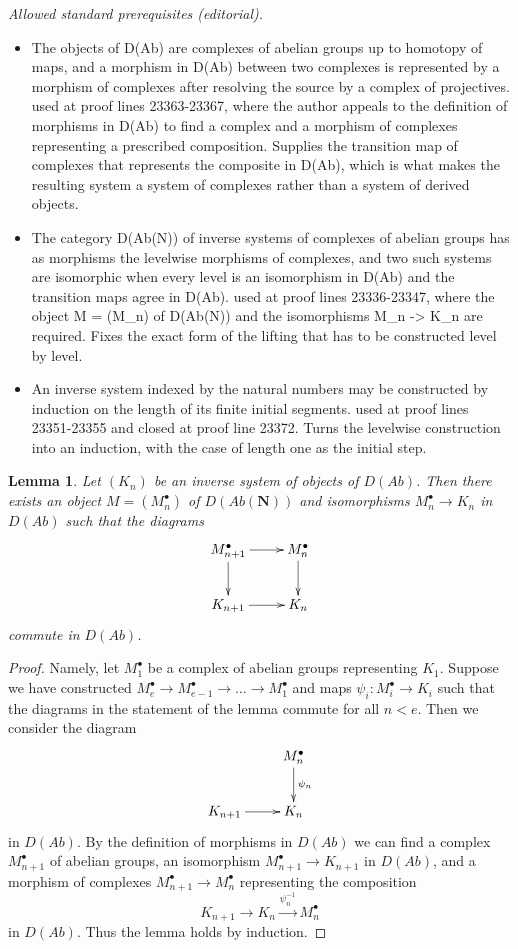 \documentclass[10pt,a4paper]{amsart}
\theoremstyle{plain}
\newtheorem{lemma}[subsection]{Lemma}
\theoremstyle{definition}
\theoremstyle{remark}
\numberwithin{equation}{subsection}
\begin{document}
\noindent\textit{Allowed standard prerequisites (editorial).}\begin{itemize}
\item The objects of D(Ab) are complexes of abelian groups up to homotopy of maps, and a morphism in D(Ab) between two complexes is represented by a morphism of complexes after resolving the source by a complex of projectives. used at proof lines 23363-23367, where the author appeals to the definition of morphisms in D(Ab) to find a complex and a morphism of complexes representing a prescribed composition. Supplies the transition map of complexes that represents the composite in D(Ab), which is what makes the resulting system a system of complexes rather than a system of derived objects.
\item The category D(Ab(N)) of inverse systems of complexes of abelian groups has as morphisms the levelwise morphisms of complexes, and two such systems are isomorphic when every level is an isomorphism in D(Ab) and the transition maps agree in D(Ab). used at proof lines 23336-23347, where the object M = (M\_n) of D(Ab(N)) and the isomorphisms M\_n -> K\_n are required. Fixes the exact form of the lifting that has to be constructed level by level.
\item An inverse system indexed by the natural numbers may be constructed by induction on the length of its finite initial segments. used at proof lines 23351-23355 and closed at proof line 23372. Turns the levelwise construction into an induction, with the case of length one as the initial step.
\end{itemize}\medskip
\begin{lemma}
\label{lemma-lift-to-system-complexes-Ab}
Let $(K_n)$ be an inverse system of objects of $D(\textit{Ab})$.
Then there exists an object $M = (M_n^\bullet)$
of $D(\textit{Ab}(\mathbf{N}))$ and isomorphisms
$M_n^\bullet \to K_n$ in $D(\textit{Ab})$ such that the diagrams
$$
\xymatrix{
M_{n + 1}^\bullet \ar[d] \ar[r] &
M_n^\bullet \ar[d] \\
K_{n + 1} \ar[r] & K_n
}
$$
commute in $D(\textit{Ab})$.
\end{lemma}

\begin{proof}
Namely, let $M_1^\bullet$ be a complex of abelian groups representing $K_1$.
Suppose we have constructed
$M_e^\bullet \to M_{e - 1}^\bullet \to \ldots \to M_1^\bullet$
and maps $\psi_i : M_i^\bullet \to K_i$ such that
the diagrams in the statement of the lemma commute for all $n < e$.
Then we consider the diagram
$$
\xymatrix{
& M_n^\bullet \ar[d]^{\psi_n} \\
K_{n + 1} \ar[r] & K_n
}
$$
in $D(\textit{Ab})$. By the definition of morphisms in $D(\textit{Ab})$
we can find a complex $M_{n + 1}^\bullet$ of abelian groups, an isomorphism
$M_{n + 1}^\bullet \to K_{n + 1}$ in $D(\textit{Ab})$, and a
morphism of complexes $M_{n + 1}^\bullet \to M_n^\bullet$
representing the composition
$$
K_{n + 1} \to K_n \xrightarrow{\psi_n^{-1}} M_n^\bullet
$$
in $D(\textit{Ab})$.
Thus the lemma holds by induction.
\end{proof}
\end{document}
